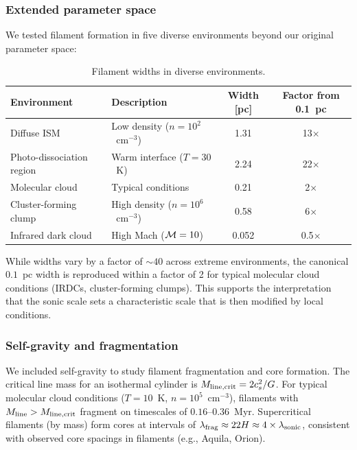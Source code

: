 \documentclass{mnras}
\begin{document}
\subsubsection{Extended parameter space}

We tested filament formation in five diverse environments beyond our original parameter space:

\begin{table}[ht]
\centering
\begin{tabular}{llcc}
\hline
Environment & Description & Width [pc] & Factor from 0.1~pc \\
\hline
Diffuse ISM & Low density ($n = 10^2$~cm$^{-3}$) & 1.31 & 13$\times$ \\
Photo-dissociation region & Warm interface ($T = 30$~K) & 2.24 & 22$\times$ \\
Molecular cloud & Typical conditions & 0.21 & 2$\times$ \\
Cluster-forming clump & High density ($n = 10^6$~cm$^{-3}$) & 0.58 & 6$\times$ \\
Infrared dark cloud & High Mach (${\cal M} = 10$) & 0.052 & 0.5$\times$ \\
\hline
\end{tabular}
\caption{Filament widths in diverse environments.}
\label{tab:environments}
\end{table}

While widths vary by a factor of $\sim 40$ across extreme environments, the canonical $0.1$~pc width is reproduced within a factor of 2 for typical molecular cloud conditions (IRDCs, cluster-forming clumps). This supports the interpretation that the sonic scale sets a characteristic scale that is then modified by local conditions.

\subsubsection{Self-gravity and fragmentation}

We included self-gravity to study filament fragmentation and core formation. The critical line mass for an isothermal cylinder is $M_{\rm line,crit} = 2c_s^2/G$. For typical molecular cloud conditions ($T = 10$~K, $n = 10^5$~cm$^{-3}$), filaments with $M_{\rm line} > M_{\rm line,crit}$ fragment on timescales of $0.16$--$0.36$~Myr. Supercritical filaments (by mass) form cores at intervals of $\lambda_{\rm frag} \approx 22 H \approx 4 \times \lambda_{\rm sonic}$, consistent with observed core spacings in filaments (e.g., Aquila, Orion).
\end{document}
